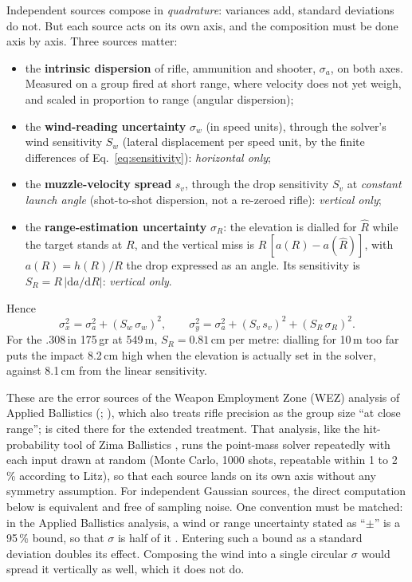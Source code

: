 \documentclass[11pt,twoside,openright]{report}
\begin{document}
Independent sources compose in \emph{quadrature}: variances add, standard deviations do not. But each source acts on its own axis, and the composition must be done axis by axis. Three sources matter:
\begin{itemize}
  \item the \textbf{intrinsic dispersion} of rifle, ammunition and shooter, $\sigma_a$, on both axes. Measured on a group fired at short range, where velocity does not yet weigh, and scaled in proportion to range (angular dispersion);
  \item the \textbf{wind-reading uncertainty} $\sigma_w$ (in speed units), through the solver's wind sensitivity $S_w$ (lateral displacement per speed unit, by the finite differences of Eq.~\eqref{eq:sensitivity}): \emph{horizontal only};
  \item the \textbf{muzzle-velocity spread} $s_v$, through the drop sensitivity $S_v$ at \emph{constant launch angle} (shot-to-shot dispersion, not a re-zeroed rifle): \emph{vertical only};
  \item the \textbf{range-estimation uncertainty} $\sigma_R$: the elevation is dialled for $\hat{R}$ while the target stands at $R$, and the vertical miss is $R\,[a(R) - a(\hat{R})]$, with $a(R) = h(R)/R$ the drop expressed as an angle. Its sensitivity is $S_R = R\,|\mathrm{d}a/\mathrm{d}R|$: \emph{vertical only}.
\end{itemize}
Hence
\begin{equation}
  \sigma_x^2 = \sigma_a^2 + \left(S_w\,\sigma_w\right)^2,
  \qquad
  \sigma_y^2 = \sigma_a^2 + \left(S_v\,s_v\right)^2 + \left(S_R\,\sigma_R\right)^2.
  \label{eq:quadrature}
\end{equation}
For the .308\,in 175\,gr at 549\,m, $S_R = 0.81$\,cm per metre: dialling for 10\,m too far puts the impact 8.2\,cm high when the elevation is actually set in the solver, against 8.1\,cm from the linear sensitivity.

These are the error sources of the Weapon Employment Zone (WEZ) analysis of Applied Ballistics (\citealp[ch.~16]{litz2015applied}; \citealp{litz2021wez}), which also treats rifle precision as the group size ``at close range''; \citet{litz2012accuracy} is cited there for the extended treatment. That analysis, like the hit-probability tool of Zima Ballistics \citep{zima_guide}, runs the point-mass solver repeatedly with each input drawn at random (Monte Carlo, 1000 shots, repeatable within 1 to 2\,\% according to Litz), so that each source lands on its own axis without any symmetry assumption. For independent Gaussian sources, the direct computation below is equivalent and free of sampling noise. One convention must be matched: in the Applied Ballistics analysis, a wind or range uncertainty stated as ``$\pm$'' is a 95\,\% bound, so that $\sigma$ is half of it \citep[footnote~1]{litz2021wez}. Entering such a bound as a standard deviation doubles its effect.
Composing the wind into a single circular $\sigma$ would spread it vertically as well, which it does not do.
\end{document}
